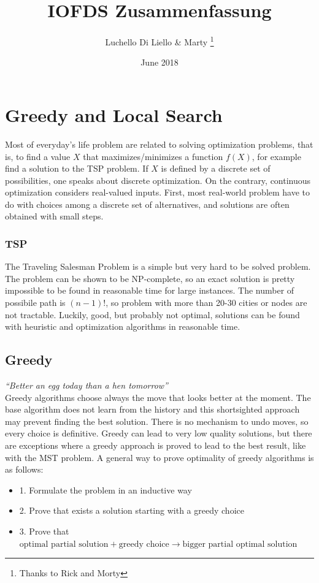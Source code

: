 \documentclass[11pt]{article}
\title{IOFDS Zusammenfassung}
\author{Luchello Di Liello \& Marty \thanks{Thanks to Rick and Morty}}
\date{June 2018}
\begin{document}
\begin{titlepage}
\maketitle
\end{titlepage}
 
\section{Greedy and Local Search}

Most of everyday's life problem are related to solving optimization problems, that is, to find a value $X$ that maximizes/minimizes a function $f(X)$, for example find a solution to the TSP problem. If $X$ is defined by a discrete set of possibilities, one speaks about discrete optimization. On the contrary, continuous optimization considers real-valued inputs. First, most real-world problem have to do with choices among a discrete set of alternatives, and solutions are often obtained with small steps.

\subsubsection{TSP}
The Traveling Salesman Problem is a simple but very hard to be solved problem. The problem can be shown to be NP-complete, so an exact solution is pretty impossible to be found in reasonable time for large instances. The number of possibile path is $(n-1)!$, so problem with more than 20-30 cities or nodes are not tractable. Luckily, good, but probably not optimal, solutions can be found with heuristic and optimization algorithms in reasonable time.

\subsection{Greedy}
\textit{``Better an egg today than a hen tomorrow''}\\
Greedy algorithms choose always the move that looks better at the moment. The base algorithm does not learn from the history and this shortsighted approach may prevent finding the best solution. There is no mechanism to undo moves, so every choice is definitive. Greedy can lead to very low quality solutions, but there are exceptions where a greedy approach is proved to lead to the best result, like with the MST problem.
A general way to prove optimality of greedy algorithms is as follows:
\begin{itemize}
\item{1. Formulate the problem in an inductive way}
\item{2. Prove that exists a solution starting with a greedy choice}
\item{3. Prove that $\text{optimal partial solution} + \text{greedy choice} \rightarrow \text{bigger partial optimal solution}$}
\end{itemize}
\end{document}
